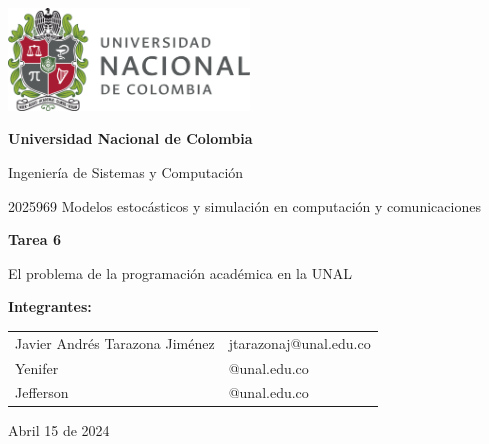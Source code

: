 \documentclass{article}
\begin{document}
\begin{titlepage}
    \centering
    \includegraphics[width=0.48\textwidth]{logo_universidad.png}
    \par\vspace{2cm}

    {\Large \textbf{Universidad Nacional de Colombia} \par}
    \vspace{0.5cm}
    {\large Ingeniería de Sistemas y Computación \par}
    {\large 2025969 Modelos estocásticos y simulación en computación y comunicaciones \par}
    \vspace{3cm}

    {\large \textbf{Tarea 6} \par}
    {\large El problema de la programación académica en la UNAL \par}
    \vspace{3cm}

    {\large \textbf{Integrantes:} \par}
    \vspace{0.5cm}
    \begin{tabular}{ll}
    Javier Andrés Tarazona Jiménez & jtarazonaj@unal.edu.co \\
    Yenifer & @unal.edu.co \\
    Jefferson & @unal.edu.co \\
    \end{tabular}
    \par\vspace{3cm}

    {\large Abril 15 de 2024 \par}
\end{titlepage}

\tableofcontents %

\newpage %

\end{document}
